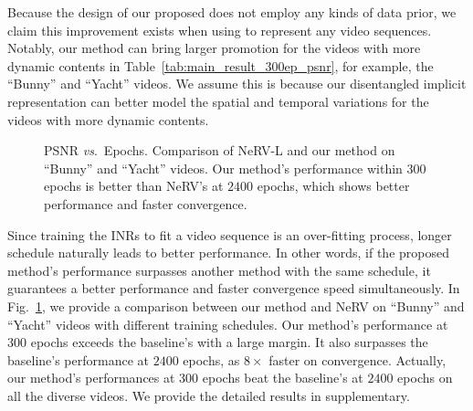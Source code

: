 \documentclass[runningheads]{llncs}
\begin{document}
Because the design of our proposed \netname does not employ any kinds of data prior, we claim this improvement exists when using \netname to represent any video sequences. Notably, our method can bring larger promotion for the videos with more dynamic contents in Table~\ref{tab:main_result_300ep_psnr}, for example, the ``Bunny'' and ``Yacht'' videos. We assume this is because our disentangled implicit representation can better model the spatial and temporal variations for the videos with more dynamic contents.

\begin{figure}[t]
\centering
    \caption{PSNR \emph{vs}.\ Epochs. Comparison of NeRV-L and our method on ``Bunny'' and ``Yacht'' videos. Our method's performance within $300$ epochs is better than NeRV's at $2400$ epochs, which shows better performance and faster convergence.}
    
    \label{fig:psnr_epochs}
\end{figure}

Since training the INRs to fit a video sequence is an over-fitting process, longer schedule naturally leads to better performance. In other words, if the proposed method's performance surpasses another method with the same schedule, it guarantees a better performance and faster convergence speed simultaneously. In Fig.~\ref{fig:psnr_epochs}, we provide a comparison between our method and NeRV on ``Bunny'' and ``Yacht'' videos with different training schedules. Our method's performance at $300$ epochs exceeds the baseline's with a large margin. It also surpasses the baseline's performance at $2400$ epochs, as $8\times$ faster on convergence. Actually, our method's performances at $300$ epochs beat the baseline's at $2400$ epochs on all the diverse videos. We provide the detailed results in supplementary.
\end{document}
